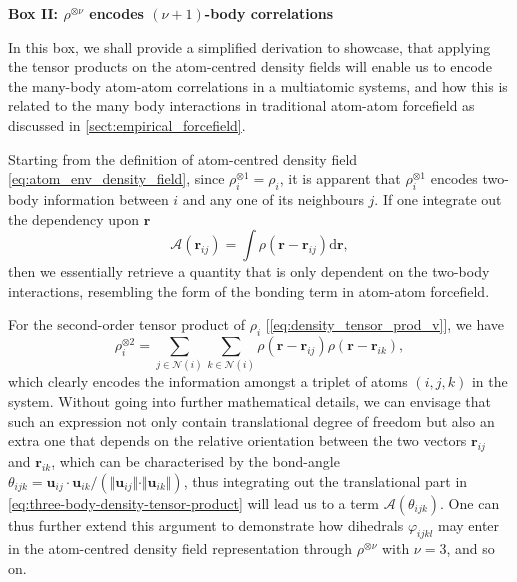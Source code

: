 \begin{myquote}
\textbf{Box II: $\rho^{\otimes \nu}$ encodes $(\nu+1)$-body correlations}

\footnotesize

In this box, we shall provide a simplified derivation to showcase, that  applying the tensor products on the atom-centred density fields will enable us to encode the many-body atom-atom correlations in a multiatomic systems, and how this is related to the many body interactions in traditional atom-atom forcefield as discussed in \cref{sect:empirical_forcefield}. 

\hspace{10pt} Starting from the definition of atom-centred density field \cref{eq:atom_env_density_field}, since $\rho_i^{\otimes 1}=\rho_i$, it is apparent that $\rho_i^{\otimes 1}$ encodes two-body information between $i$ and any one of its neighbours $j$. If one integrate out the dependency upon $\bm{r}$
\begin{equation}
    \label{eq:two-body-density-tensor-product-invariant}
    \mathcal{A}(\bm{r}_{ij})=\int\rho(\bm{r}-\bm{r}_{ij})\mathrm{d}\bm{r},
\end{equation}
then we essentially retrieve a quantity that is only dependent on the two-body interactions, resembling the form of the bonding term in atom-atom forcefield.

\hspace{10pt} For the second-order tensor product of $\rho_i$ [\cref{eq:density_tensor_prod_v}], we have
\begin{equation}
    \label{eq:three-body-density-tensor-product}
   \rho_i^{\otimes 2}=\sum_{j \in\mathcal{N}(i)}\sum_{k \in\mathcal{N}(i)}\rho(\bm{r}-\bm{r}_{ij})\rho(\bm{r}-\bm{r}_{ik}),
\end{equation}
which clearly encodes the information amongst a triplet of atoms $(i,j,k)$ in the system. Without going into further mathematical details, we can envisage that such an expression not only contain translational degree of freedom but also an extra one that depends on the relative orientation between the two vectors $\bm{r}_{ij}$ and $\bm{r}_{ik}$, which can be characterised by the bond-angle $\theta_{ijk}=\bm{u}_{ij}\cdot\bm{u}_{ik}/(\Vert \bm{u}_{ij}\Vert\cdot\Vert\bm{u}_{ik}\Vert)$, thus integrating out the translational part in \cref{eq:three-body-density-tensor-product} will lead us to a term $\mathcal{A}(\theta_{ijk})$. One can thus further extend this argument to demonstrate how dihedrals $\varphi_{ijkl}$ may enter in the atom-centred density field representation through $\rho^{\otimes \nu}$ with $\nu=3$, and so on.


\end{myquote}
